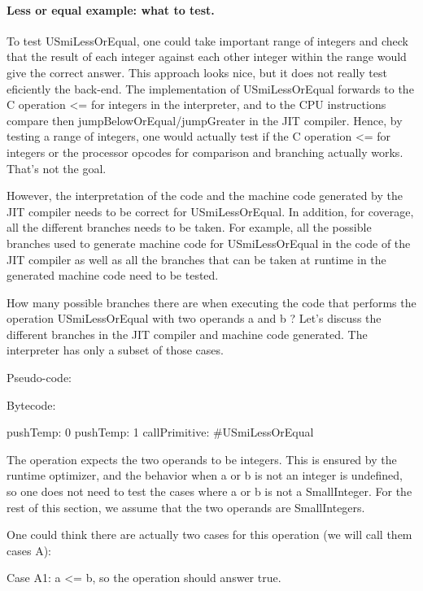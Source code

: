 \documentclass[a4paper,12pt,twoside]{../includes/ThesisStyle}
\begin{document}
\paragraph{Less or equal example: what to test.}

To test USmiLessOrEqual, one could take important range of integers and check that the result of each integer against each other integer within the range would give the correct answer. This approach looks nice, but it does not really test eficiently the back-end. The implementation of USmiLessOrEqual forwards to the C operation <= for integers in the interpreter, and to the CPU instructions compare then jumpBelowOrEqual/jumpGreater in the JIT compiler. Hence, by testing a range of integers, one would actually test if the C operation <= for integers or the processor opcodes for comparison and branching actually works. That's not the goal.

However, the interpretation of the code and the machine code generated by the JIT compiler needs to be correct for USmiLessOrEqual. In addition, for coverage, all the different branches needs to be taken. For example, all the possible branches used to generate machine code for USmiLessOrEqual in the code of the JIT compiler as well as all the branches that can be taken at runtime in the generated machine code need to be tested.

How many possible branches there are when executing the code that performs the operation USmiLessOrEqual with two operands a and b ? Let's discuss the different branches in the JIT compiler and machine code generated. The interpreter has only a subset of those cases.

Pseudo-code:


Bytecode:

\begin{code}
pushTemp: 0
pushTemp: 1
callPrimitive: \#USmiLessOrEqual
\end{code}

The operation expects the two operands to be integers. This is ensured by the runtime optimizer, and the behavior when a or b is not an integer is undefined, so one does not need to test the cases where a or b is not a SmallInteger. For the rest of this section, we assume that the two operands are SmallIntegers.

One could think there are actually two cases for this operation (we will call them cases A):

Case A1: a <= b, so the operation should answer true.
\end{document}
